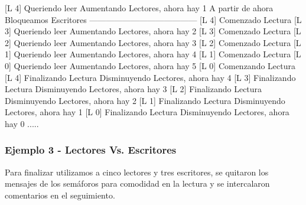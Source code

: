 \begin{scriptsize} 
\begin{verbatimtab}

[L 4] Queriendo leer
Aumentando Lectores, ahora hay 1
A partir de ahora Bloqueamos Escritores
---------------------------------------
[L 4] Comenzado Lectura
[L 3] Queriendo leer
Aumentando Lectores, ahora hay 2
[L 3] Comenzado Lectura
[L 2] Queriendo leer
Aumentando Lectores, ahora hay 3
[L 2] Comenzado Lectura
[L 1] Queriendo leer
Aumentando Lectores, ahora hay 4
[L 1] Comenzado Lectura
[L 0] Queriendo leer
Aumentando Lectores, ahora hay 5
[L 0] Comenzando Lectura
[L 4] Finalizando Lectura
Disminuyendo Lectores, ahora hay 4
[L 3] Finalizando Lectura
Disminuyendo Lectores, ahora hay 3
[L 2] Finalizando Lectura
Disminuyendo Lectores, ahora hay 2
[L 1] Finalizando Lectura
Disminuyendo Lectores, ahora hay 1
[L 0] Finalizando Lectura
Disminuyendo Lectores, ahora hay 0
.....
\end{verbatimtab}
\end{scriptsize}

\subsubsection{Ejemplo 3 - Lectores Vs. Escritores}
Para finalizar utilizamos a cinco lectores y tres escritores, se quitaron los mensajes de los sem\'aforos para 
comodidad en la lectura y se intercalaron comentarios en el seguimiento.

